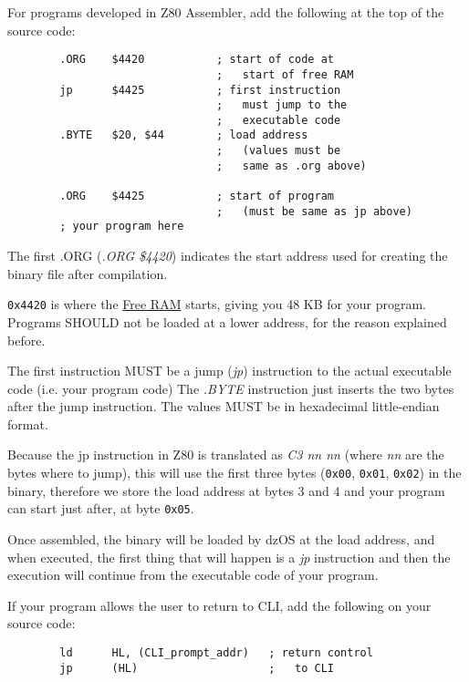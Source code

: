         For programs developed in Z80 Assembler, add the following at the top of the
        source code:

        \begin{lstlisting}
        .ORG    $4420           ; start of code at
                                ;   start of free RAM
        jp      $4425           ; first instruction
                                ;   must jump to the
                                ;   executable code
        .BYTE   $20, $44        ; load address
                                ;   (values must be
                                ;   same as .org above)

        .ORG    $4425           ; start of program
                                ;   (must be same as jp above)
        ; your program here
        \end{lstlisting}

        The first .ORG (\textit{.ORG \$4420}) indicates the start address used for
        creating the binary file after compilation.

        \texttt{0x4420} is where the \hyperref[subsec:memmap:ram]{Free RAM}
        starts, giving you 48 KB for your program. Programs SHOULD not be loaded
        at a lower address, for the reason explained before.

        The first instruction MUST be a jump (\textit{jp}) instruction to the actual
        executable code (i.e. your program code) The \textit{.BYTE} instruction just
        inserts the two bytes after the jump instruction. The values MUST be in
        hexadecimal little-endian format.

        Because the jp instruction in Z80 is translated as \textit{C3 nn nn} (where
        \textit{nn} are the bytes where to jump), this will use the first three
        bytes (\texttt{0x00}, \texttt{0x01}, \texttt{0x02}) in the binary, therefore
        we store the load address at bytes 3 and 4 and your program can start just
        after, at byte \texttt{0x05}.

        Once assembled, the binary will be loaded by dzOS at the load address, and
        when executed, the first thing that will happen is a \textit{jp} instruction
        and then the execution will continue from the executable code of your
        program.

        If your program allows the user to return to CLI, add the following on your
        source code:

        \begin{lstlisting}
        ld      HL, (CLI_prompt_addr)   ; return control
        jp      (HL)                    ;   to CLI
        \end{lstlisting}

